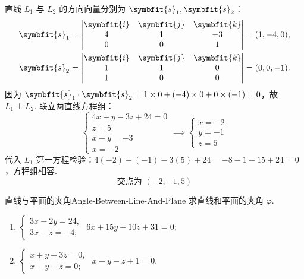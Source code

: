 \begin{solution}
    直线 $L_1$ 与 $L_2$ 的方向向量分别为 $\symbfit{s}_1, \symbfit{s}_2$：
    \begin{equation*}
        \begin{aligned}
            \symbfit{s}_1 & = \begin{vmatrix} \symbfit{i} & \symbfit{j} & \symbfit{k} \\ 4 & 1 & -3 \\ 0 & 0 & 1 \end{vmatrix} = (1, -4, 0), \\
            \symbfit{s}_2 & = \begin{vmatrix} \symbfit{i} & \symbfit{j} & \symbfit{k} \\ 1 & 1 & 0 \\ 1 & 0 & 0 \end{vmatrix} = (0, 0, -1).
        \end{aligned}
    \end{equation*}
    因为 $\symbfit{s}_1 \cdot \symbfit{s}_2 = 1 \times 0 + (-4) \times 0 + 0 \times (-1) = 0$，故 $L_1 \perp L_2$.
    联立两直线方程组：
    \begin{equation*}
        \begin{cases} 4x + y - 3z + 24 = 0 \\ z = 5 \\ x + y = -3 \\ x = -2 \end{cases} \implies \begin{cases} x = -2 \\ y = -1 \\ z = 5 \end{cases}
    \end{equation*}
    代入 $L_1$ 第一方程检验：$4(-2) + (-1) - 3(5) + 24 = -8 - 1 - 15 + 24 = 0$，方程组相容.
    \begin{equation*}
        \boxed{ \text{交点为 } (-2, -1, 5) }
    \end{equation*}
\end{solution}


\begin{problem}{直线与平面的夹角}{Angle-Between-Line-And-Plane}
    求直线和平面的夹角 $\varphi$.
    \begin{enumerate}
        \item \(\begin{cases} 3x - 2y = 24, \\ 3x - z = -4; \end{cases}\) \quad \(6x + 15y - 10z + 31 = 0;\)
        \item \(\begin{cases} x + y + 3z = 0, \\ x - y - z = 0; \end{cases}\) \quad \(x - y - z + 1 = 0.\)
    \end{enumerate}
\end{problem}

